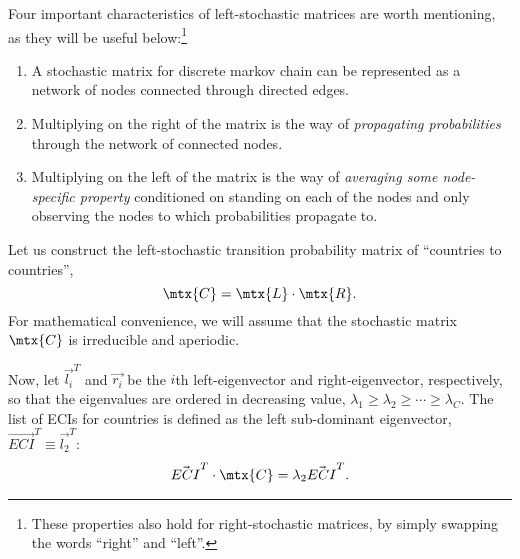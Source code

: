 \documentclass[9pt,twocolumn,twoside,lineno]{pnas-new}
\begin{document}
Four important characteristics of left-stochastic matrices are worth mentioning, as they will be useful below:\footnote{These properties also hold for right-stochastic matrices, by simply swapping the words ``right'' and ``left''.} 
\begin{enumerate}
    \item A stochastic matrix for discrete markov chain can be represented as a network of nodes connected through directed edges. 
    \item Multiplying on the right of the matrix is the way of \emph{propagating probabilities} through the network of connected nodes. 
    \item Multiplying on the left of the matrix is the way of \emph{averaging some node-specific property} conditioned on standing on each of the nodes and only observing the nodes to which probabilities propagate to.
\end{enumerate}


Let us construct the left-stochastic transition probability matrix of ``countries to countries'', $$\mtx{C}=\mtx{L}\cdot\mtx{R}.$$ For mathematical convenience, we will assume that the stochastic matrix $\mtx{C}$ is irreducible and aperiodic. 

Now, let $\vec{l_i}^T$ and $\vec{r_i}$ be the $i$th left-eigenvector and right-eigenvector, respectively, so that the eigenvalues are ordered in decreasing value, $\lambda_1\geq \lambda_2\geq\cdots\geq \lambda_C$. The list of ECIs for countries is defined as the left sub-dominant eigenvector, $\vec{ECI}^T\equiv \vec{l_2}^T$:
\begin{align}
	\vec{ECI}^T\cdot \mtx{C}=\lambda_2 \vec{ECI}^T.
\label{eqn:drag}
\end{align}
\end{document}

